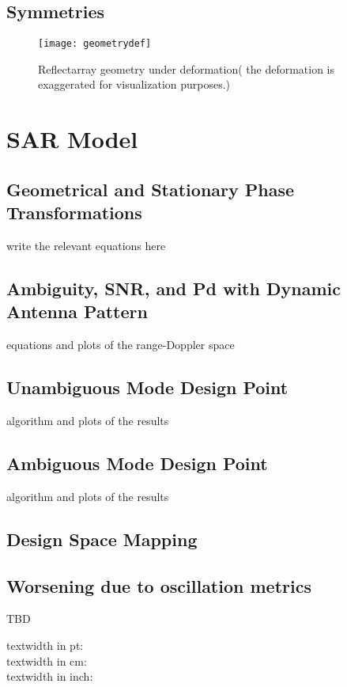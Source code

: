 \documentclass[11pt, a4paper]{scrartcl}
\begin{document}
    \subsection{Symmetries}
    \label{subsec:symmetries}
    \begin{figure}[!t]
        \texttt{[image: geometrydef]}
        \caption{Reflectarray geometry under deformation( the deformation is exaggerated for visualization purposes.)}
        \label{fig:radef}
    \end{figure}


    \section{SAR Model}
    \label{sec:sar_model}

    \subsection{Geometrical and Stationary Phase Transformations}
    \label{subsec:transformations}
    write the relevant equations here

    \subsection{Ambiguity, SNR, and Pd with Dynamic Antenna Pattern}
    \label{subsec:ambiguity_snr_pd_with_dynamic_antenna_pattern}
    equations and plots of the range-Doppler space

    \subsection{Unambiguous Mode Design Point}
    \label{subsec:unambiguous_mode_design_point}
    algorithm and plots of the results

    \subsection{Ambiguous Mode Design Point}
    \label{subsec:ambiguous_mode_design_point}
    algorithm and plots of the results

    \subsection{Design Space Mapping}
    \label{subsec:design_space_mapping}

    \subsection{Worsening due to oscillation metrics}
    \label{subsec:worsening_due_to_oscillation_metrics}
    TBD
    
    

    textwidth in pt: \the\textwidth \\
    textwidth in cm: \prntlen{\textwidth}\\
    textwidth in inch: \prntlen{\textwidth}\\
\end{document}

